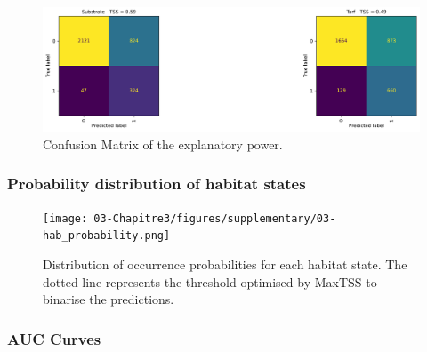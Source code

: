 \begin{figure}
\ContinuedFloat
\centering
\includegraphics{03-Chapitre3/figures/supplementary/03-confusion_matrix_train_all_d.png}
\caption{Confusion Matrix of the explanatory
power.}
\end{figure}


\hypertarget{probability-distribution-of-habitat-states}{%
\subsubsection*{Probability distribution of habitat
states}\label{probability-distribution-of-habitat-states}}

\begin{figure}
\hypertarget{fig:chap3figS7}{%
\centering
\texttt{[image: 03-Chapitre3/figures/supplementary/03-hab\_probability.png]}
\caption{Distribution of occurrence probabilities for each habitat
state. The dotted line represents the threshold optimised by MaxTSS to
binarise the predictions.}\label{fig:chap3figS7}
}
\end{figure}

\hypertarget{auc-curves}{%
\subsubsection*{AUC Curves}\label{auc-curves}}

